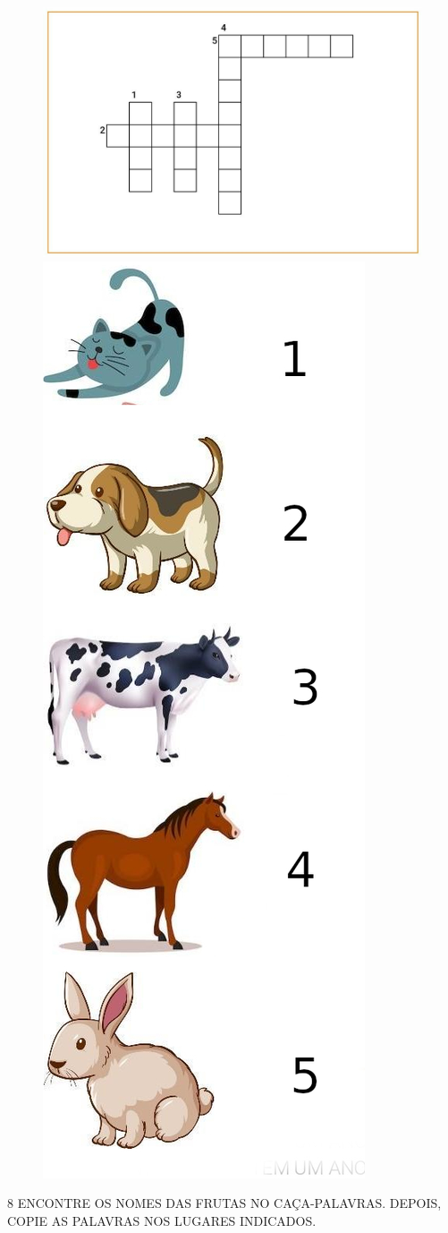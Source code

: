 \begin{figure}[htpb!]
\includegraphics[width=\textwidth]{media/image90.jpg}

\includegraphics[width=.22\textwidth]{media/image90b.jpg}
\end{figure}


\pagebreak
\num{8} ENCONTRE OS NOMES DAS FRUTAS NO CAÇA-PALAVRAS. DEPOIS, COPIE AS PALAVRAS NOS LUGARES INDICADOS.


